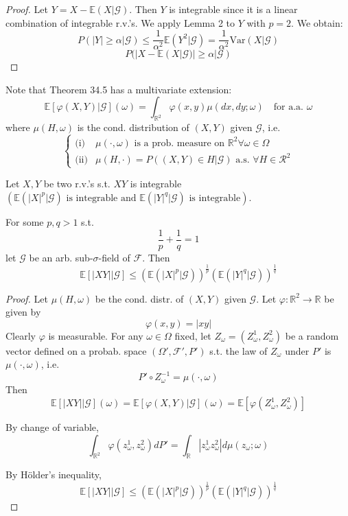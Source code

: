 \begin{proof}
Let \(Y = X - \mathbb{E}(X|\mathcal{G})\). Then \(Y\) is integrable since it is a linear combination of integrable r.v.'s. We apply Lemma 2 to \(Y\) with \(p = 2\). We obtain:
\[
P(|Y| \geq \alpha | \mathcal{G}) \leq \frac{1}{\alpha^2} \mathbb{E}(Y^2 | \mathcal{G}) = \frac{1}{\alpha^2} \text{Var}(X|\mathcal{G})
\]
\[
P(|X - \mathbb{E}(X|\mathcal{G})| \geq \alpha | \mathcal{G})
\]
\end{proof}

Note that Theorem 34.5 has a multivariate extension:
\[
\mathbb{E}[\varphi(X,Y) | \mathcal{G}](\omega) = \int_{\mathbb{R}^2} \varphi(x,y) \mu(dx,dy;\omega) \quad \text{for a.a. } \omega
\]
where \(\mu(H,\omega)\) is the cond. distribution of \((X,Y)\) given \(\mathcal{G}\), i.e.
\[
\begin{cases}
\text{(i)} & \mu(\cdot, \omega) \text{ is a prob. measure on } \mathbb{R}^2 \forall \omega \in \Omega \\
\text{(ii)} & \mu(H, \cdot) = P((X,Y) \in H | \mathcal{G}) \text{ a.s. } \forall H \in \mathcal{R}^2
\end{cases}
\]

\begin{lemma}
Let \(X, Y\) be two r.v.'s s.t. \(XY\) is integrable \(\left(\mathbb{E}(|X|^p | \mathcal{G}) \text{ is integrable and } \mathbb{E}(|Y|^q | \mathcal{G}) \text{ is integrable} \right)\).

For some \(p, q > 1\) s.t.
\[
\frac{1}{p} + \frac{1}{q} = 1
\]
let \(\mathcal{G}\) be an arb. sub-\(\sigma\)-field of \(\mathcal{F}\). Then
\[
\mathbb{E}[|XY| | \mathcal{G}] \leq \left( \mathbb{E}(|X|^p | \mathcal{G}) \right)^{\frac{1}{p}} \left( \mathbb{E}(|Y|^q | \mathcal{G}) \right)^{\frac{1}{q}}
\]
\end{lemma}

\begin{proof}
Let \(\mu(H, \omega)\) be the cond. distr. of \((X,Y)\) given \(\mathcal{G}\). Let \(\varphi : \mathbb{R}^2 \to \mathbb{R}\) be given by
\[
\varphi(x,y) = |xy|
\]
Clearly \(\varphi\) is measurable. For any \(\omega \in \Omega\) fixed, let \(Z_\omega = (Z_\omega^1, Z_\omega^2)\) be a random vector defined on a probab. space \((\Omega', \mathcal{F}', P')\) s.t. the law of \(Z_\omega\) under \(P'\) is \(\mu(\cdot, \omega)\), i.e.
\[
P' \circ Z_\omega^{-1} = \mu(\cdot, \omega)
\]
Then
\[
\mathbb{E}[|XY| | \mathcal{G}](\omega) = \mathbb{E}[\varphi(X,Y) | \mathcal{G}](\omega) = \mathbb{E}[\varphi(Z_\omega^1, Z_\omega^2)]
\]

By change of variable,
\[
\int_{\mathbb{R}^2} \varphi(z_\omega^1, z_\omega^2) dP' = \int_{\mathbb{R}} |z_\omega^1 z_\omega^2| d\mu(z_\omega; \omega)
\]

By Hölder's inequality,
\[
\mathbb{E}[|XY| | \mathcal{G}] \leq \left( \mathbb{E}(|X|^p | \mathcal{G}) \right)^{\frac{1}{p}} \left( \mathbb{E}(|Y|^q | \mathcal{G}) \right)^{\frac{1}{q}}
\]
\end{proof}

